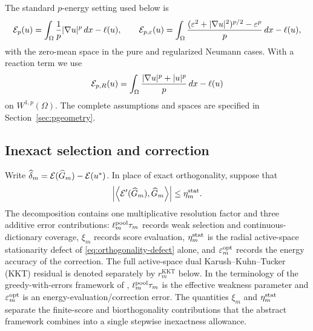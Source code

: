 The standard $p$-energy setting used below is
\[
 \mathcal{E}_p(u)=\int_\Omega \frac1p|\nabla u|^p\,dx-\ell(u),\qquad
 \mathcal{E}_{p,\varepsilon}(u)=\int_\Omega
 \frac{(\varepsilon^2+|\nabla u|^2)^{p/2}-\varepsilon^p}{p}\,dx-\ell(u),
\]
with the zero-mean space in the pure and regularized Neumann cases. With a reaction
term we use
\[
 \mathcal{E}_{p,R}(u)=\int_\Omega\frac{|\nabla u|^p+|u|^p}{p}\,dx-\ell(u)
\]
on $W^{1,p}(\Omega)$. The complete assumptions and spaces are specified in
Section~\ref{sec:pgeometry}.

\subsection{Inexact selection and correction}

Write \(\widehat\delta_m=\mathcal{E}(\widehat G_m)-\mathcal{E}(u^*)\). In place of exact orthogonality, suppose that
\begin{equation}
  \left\lvert \left\langle \mathcal{E}'(\widehat G_m),\widehat G_m\right\rangle\right\rvert\leq\eta_m^{\rm stat}.
  \label{eq:orthogonality-defect}
\end{equation}
The decomposition contains one multiplicative resolution factor and three additive error
contributions: \(t_m^{\rm pool}\tau_m\) records weak selection and continuous-dictionary coverage,
\(\xi_m\) records score evaluation, \(\eta_m^{\rm stat}\) is the radial active-space stationarity
defect of \cref{eq:orthogonality-defect} alone, and \(\varepsilon_m^{\rm opt}\) records the energy
accuracy of the correction. The full active-space dual Karush--Kuhn--Tucker (KKT) residual is
denoted separately by \(r_m^{\mathrm{KKT}}\) below. In the terminology of the greedy-with-errors
framework of \citet[Section~3]{DereventsovTemlyakov2022}, \(t_m^{\rm pool}\tau_m\) is the effective
weakness parameter and \(\varepsilon_m^{\rm opt}\) is an energy-evaluation/correction error. The
quantities \(\xi_m\) and \(\eta_m^{\rm stat}\) separate the finite-score and biorthogonality
contributions that the abstract framework combines into a single stepwise inexactness allowance.


